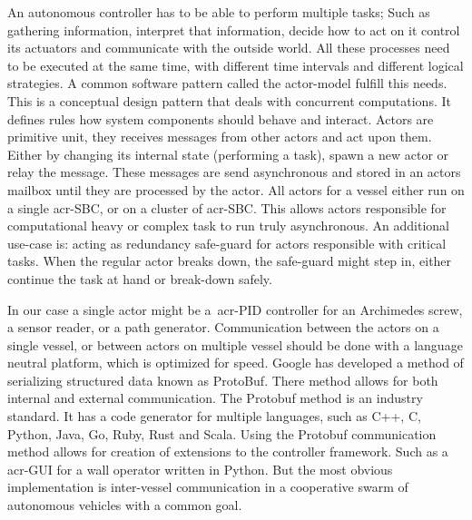 An autonomous controller has to be able to perform multiple tasks; Such as gathering information, interpret that
information, decide how to act on it control its actuators and communicate with the outside world. All these processes
need to be executed at the same time, with different time intervals and different logical strategies. A common software
pattern called the actor-model fulfill this needs. This is a conceptual design pattern that deals with concurrent
computations. It defines rules how system components should behave and interact. Actors are primitive unit, they
receives messages from other actors and act upon them. Either by changing its internal state (performing a task), spawn
a new actor or relay the message. These messages are send asynchronous and stored in an actors mailbox until they are
processed by the actor. All actors for a vessel either run on a single \gls{acr-SBC}, or on a cluster of \gls{acr-SBC}.
This allows actors responsible for computational heavy or complex task to run truly asynchronous. An additional use-case
is: acting as redundancy safe-guard for actors responsible with critical tasks. When the regular actor breaks down, the
safe-guard might step in, either continue the task at hand or break-down safely.

In our case a single actor might be a~\gls{acr-PID} controller for an Archimedes screw, a sensor reader, or a
path generator. Communication between the actors on a single vessel, or between actors on multiple vessel should be done
with a language neutral platform, which is optimized for speed. Google has developed a method of serializing structured
data known as ProtoBuf. There method allows for both internal and external communication. The Protobuf method is an
industry standard. It has a code generator for multiple languages, such as C++, C, Python, Java, Go, Ruby, Rust and
Scala. Using the Protobuf communication method allows for creation of extensions to the controller framework. Such as a
\gls{acr-GUI} for a wall operator written in Python. But the most obvious implementation is inter-vessel
communication in a cooperative swarm of autonomous vehicles with a common goal.

